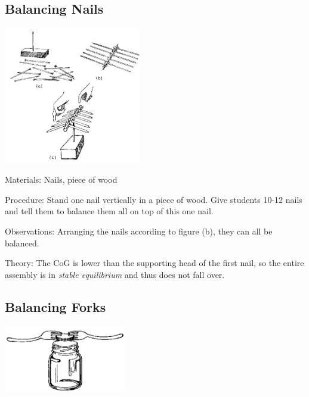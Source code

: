 \begin{multicols}{2}
\subsection{Balancing Nails}

\begin{center}
\includegraphics[width=0.45\textwidth]{./img/source/nails-1.png}
\end{center}

\begin{description*}
\item[Materials:]{Nails, piece of wood}
\item[Procedure:]{Stand one nail vertically in a piece of wood. Give students 10-12 nails and tell them to balance them all on top of this one nail.}
\item[Observations:]{Arranging the nails according to figure (b), they can all be balanced.}
\item[Theory:]{The CoG is lower than the supporting head of the first nail, so the entire assembly is in \emph{stable equilibrium} and thus does not fall over.}
\end{description*}

\subsection{Balancing Forks}

\begin{center}
\includegraphics[width=0.4\textwidth]{./img/source/forks.png}
\end{center}


\end{multicols}
